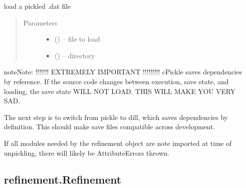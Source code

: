 \documentclass[letterpaper,10pt,english]{sphinxmanual}
\begin{document}
\begin{fulllineitems}
\label{\detokenize{rst/refinement:mstack.refinement.load}}
load a pickled .dat file
\begin{quote}\begin{description}
\item[{Parameters}] \leavevmode\begin{itemize}
\item {} 
 () -- file to load

\item {} 
 () -- directory

\end{itemize}

\end{description}\end{quote}

\begin{sphinxadmonition}{note}{Note:}
!!!!!!! EXTREMELY IMPORTANT !!!!!!!!!
cPickle saves dependencies by reference. If the source code changes between
execution, save state, and loading, the save state WILL NOT LOAD. THIS WILL
MAKE YOU VERY SAD.

The next step is to switch from pickle to dill, which saves dependencies by
definition. This should make save files compatible across development.

If all modules needed by the refinement object are note imported at time of
unpickling, there will likely be AttributeErrors thrown.
\end{sphinxadmonition}

\end{fulllineitems}



\subsection{refinement.Refinement}
\label{\detokenize{rst/refinement:refinement-refinement}}
\end{document}
